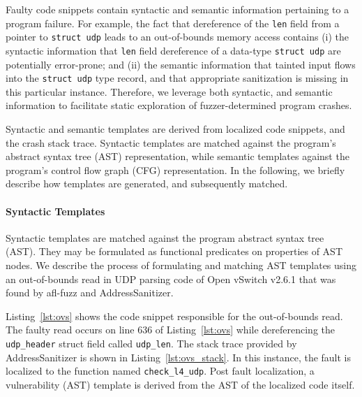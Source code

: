 Faulty code snippets contain syntactic and semantic information pertaining to a program failure.
For example, the fact that dereference of the {\tt len} field from a pointer to {\tt struct udp} leads to an out-of-bounds memory access contains (i) the syntactic information that {\tt len} field dereference of a data-type {\tt struct udp} are potentially error-prone; and (ii) the semantic information that tainted input flows into the {\tt struct udp} type record, and that appropriate sanitization is missing in this particular instance.
Therefore, we leverage both syntactic, and semantic information to facilitate static exploration of fuzzer-determined program crashes.

Syntactic and semantic templates are derived from localized code snippets, and the crash stack trace.
Syntactic templates are matched against the program's abstract syntax tree (AST) representation, while semantic templates against the program's control flow graph (CFG) representation.
In the following, we briefly describe how templates are generated, and subsequently matched.

\paragraph{Syntactic Templates}

Syntactic templates are matched against the program abstract syntax tree (AST).
They may be formulated as functional predicates on properties of AST nodes.
We describe the process of formulating and matching AST templates using an out-of-bounds read in UDP parsing code of Open vSwitch v2.6.1 that was found by afl-fuzz and AddressSanitizer.

Listing~\ref{lst:ovs} shows the code snippet responsible for the out-of-bounds read.
The faulty read occurs on line 636 of Listing~\ref{lst:ovs} while dereferencing the {\tt udp\_header} struct field called {\tt udp\_len}.
The stack trace provided by AddressSanitizer is shown in Listing~\ref{lst:ovs_stack}.
In this instance, the fault is localized to the function named {\tt check\_l4\_udp}.
Post fault localization, a vulnerability (AST) template is derived from the AST of the localized code itself.




